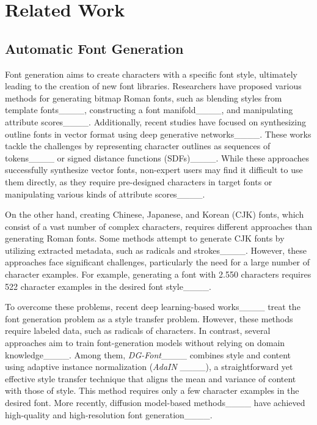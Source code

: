 \section{Related Work}
\subsection{Automatic Font Generation}
Font generation aims to create characters with a specific font style, ultimately leading to the creation of new font libraries.
Researchers have proposed various methods for generating bitmap Roman fonts, such as blending styles from template fonts____, constructing a font manifold____, and manipulating attribute scores____.
Additionally, recent studies have focused on synthesizing outline fonts in vector format using deep generative networks____.
These works tackle the challenges by representing character outlines as sequences of tokens____ or signed distance functions (SDFs)____.
While these approaches successfully synthesize vector fonts, non-expert users may find it difficult to use them directly, as they require pre-designed characters in target fonts or manipulating various kinds of attribute scores____.

On the other hand, creating Chinese, Japanese, and Korean (CJK) fonts, which consist of a vast number of complex characters, requires different approaches than generating Roman fonts.
Some methods attempt to generate CJK fonts by utilizing extracted metadata, such as radicals and strokes____.
However, these approaches face significant challenges, particularly the need for a large number of character examples.
For example, generating a font with \num{2,550} characters requires \num{522} character examples in the desired font style____.

To overcome these problems, recent deep learning-based works____ treat the font generation problem as a style transfer problem.
However, these methods require labeled data, such as radicals of characters.
In contrast, several approaches aim to train font-generation models without relying on domain knowledge____.
Among them, \textit{DG-Font}____ combines style and content using adaptive instance normalization (\textit{AdaIN} ____), a straightforward yet effective style transfer technique that aligns the mean and variance of content with those of style.
This method requires only a few character examples in the desired font.
More recently, diffusion model-based methods____ have achieved high-quality and high-resolution font generation____.

